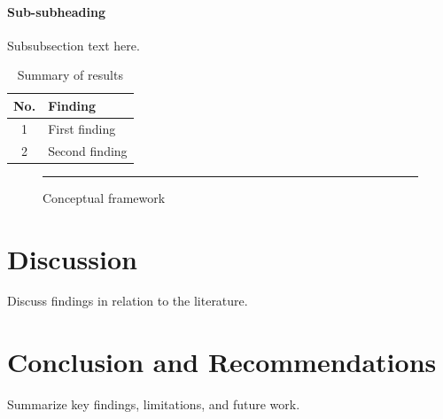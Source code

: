 \documentclass{muthesis2026}
\begin{document}
\subsubsection{Sub-subheading}
Subsubsection text here.

\begin{table}[h]
\centering
\caption{Summary of results}
\begin{tabular}{cl}
\hline
No. & Finding \\
\hline
1 & First finding \\
2 & Second finding \\
\hline
\end{tabular}
\end{table}

\begin{figure}[h]
\centering
\rule{6cm}{4cm}
\caption{Conceptual framework}
\end{figure}

\chapter{Discussion}
Discuss findings in relation to the literature.

\chapter{Conclusion and Recommendations}
Summarize key findings, limitations, and future work.




\biography
\end{document}
